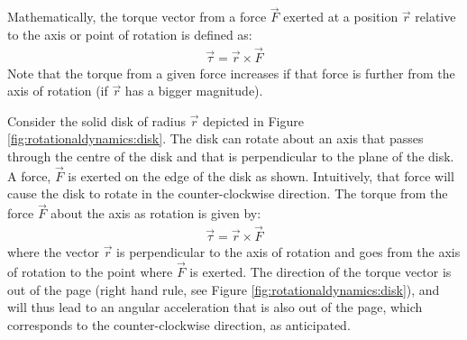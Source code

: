 Mathematically, the torque vector from a force $\vec F$ exerted at a position $\vec r$ relative to the axis or point of rotation is defined as:
\begin{align*}
\vec \tau = \vec r \times \vec F
\end{align*}
Note that the torque from a given force increases if that force is further from the axis of rotation (if $\vec r$ has a bigger magnitude). 

Consider the solid disk of radius $\vec r$ depicted in Figure \ref{fig:rotationaldynamics:disk}. The disk can rotate about an axis that passes through the centre of the disk and that is perpendicular to the plane of the disk. A force, $\vec F$ is exerted on the edge of the disk as shown.
Intuitively, that force will cause the disk to rotate in the counter-clockwise direction. The torque from the force $\vec F$ about the axis as rotation is given by:
\begin{align*}
\vec \tau = \vec r \times \vec F
\end{align*}
where the vector $\vec r$ is perpendicular to the axis of rotation and goes from the axis of rotation to the point where $\vec F$ is exerted. The direction of the torque vector is out of the page (right hand rule, see Figure \ref{fig:rotationaldynamics:disk}), and will thus lead to an angular acceleration that is also out of the page, which corresponds to the counter-clockwise direction, as anticipated. 

